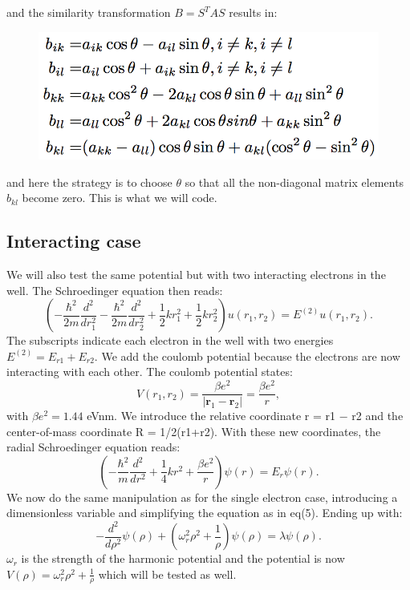 \documentclass[twocolumn]{article}
\begin{document}
and the similarity transformation $B = S^T AS$ results in:
\begin{figure}[h!]
  \includegraphics[width=\linewidth]{pict_3.png}
\end{figure}

and here the strategy is to choose $\theta$ so that all the non-diagonal matrix elements $b_{kl}$ become zero. This is what we will code.
\subsection*{Interacting case}
We will also test the same potential but with two interacting electrons in the well. The Schroedinger equation then reads:
\begingroup\makeatletter\def\f@size{8}\check@mathfonts
\def\maketag@@@#1{\hbox{\m@th\large\normalfont#1}}%
\begin{equation*}
\left(  -\frac{\hbar^2}{2 m} \frac{d^2}{dr_1^2} -\frac{\hbar^2}{2 m} \frac{d^2}{dr_2^2}+ \frac{1}{2}k r_1^2+ \frac{1}{2}k r_2^2\right)u(r_1,r_2)  = E^{(2)} u(r_1,r_2) .
\end{equation*}\endgroup
The subscripts indicate each electron in the well with two energies $E^{(2)} = E_{r1} + E_{r2}$. 
We add the coulomb potential because the electrons are now interacting with each other. The coulomb potential states:
\begin{equation*}
V(r_1,r_2) = \frac{\beta e^2}{|\mathbf{r}_1-\mathbf{r}_2|}=\frac{\beta e^2}{r},
\end{equation*}
with $\beta e^2=1.44$ eVnm.
We introduce the relative coordinate r = r1 − r2 and the center-of-mass
coordinate R = 1/2(r1+r2). With these new coordinates, the radial Schroedinger
equation reads:
\begin{equation*}
\left(  -\frac{\hbar^2}{m} \frac{d^2}{dr^2}+ \frac{1}{4}k r^2+\frac{\beta e^2}{r}\right)\psi(r)  = E_r \psi(r).
\end{equation*}
We now do the same manipulation as for the single electron case, introducing a dimensionless variable and simplifying the equation as in eq(5). Ending up with:
\begin{equation*}
  -\frac{d^2}{d\rho^2} \psi(\rho) + (\omega_r^2\rho^2 +\frac{1}{\rho})\psi(\rho) = \lambda \psi(\rho).
\end{equation*}
$\omega_r$ is the strength of the harmonic potential and the potential is now $V(\rho) = \omega_r^2\rho^2 + \frac{1}{\rho}$ which will be tested as well. 
\end{document}
